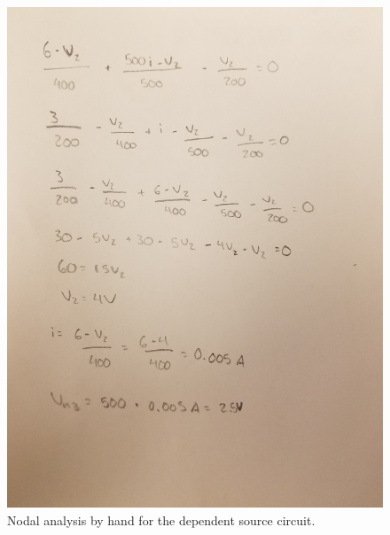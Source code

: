 \documentclass[10pt]{article}
\begin{document}
\begin{figure}[H]
	\centering
		\includegraphics[width=5in, angle=270]{Capture11}
	\caption{Nodal analysis by hand for the dependent source circuit.}
\end{figure}
\end{document}
